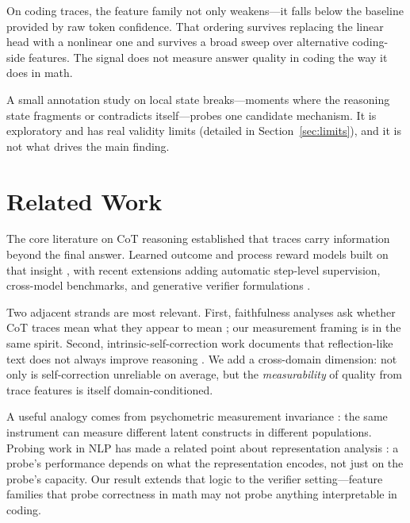 \documentclass[10pt,twocolumn]{article}
\begin{document}
On coding traces, the feature family not only weakens---it falls below the baseline provided by raw token confidence. That ordering survives replacing the linear head with a nonlinear one and survives a broad sweep over alternative coding-side features. The signal does not measure answer quality in coding the way it does in math.

A small annotation study on local state breaks---moments where the reasoning state fragments or contradicts itself---probes one candidate mechanism. It is exploratory and has real validity limits (detailed in Section~\ref{sec:limits}), and it is not what drives the main finding.

\section{Related Work}

The core literature on CoT reasoning \citep{wei2022cot,wang2023selfconsistency} established that traces carry information beyond the final answer. Learned outcome and process reward models built on that insight \citep{cobbe2021training,lightman2023verify}, with recent extensions adding automatic step-level supervision, cross-model benchmarks, and generative verifier formulations \citep{wang2024mathshepherd,zheng2025processbench,zhang2025genrm}.

Two adjacent strands are most relevant. First, faithfulness analyses ask whether CoT traces mean what they appear to mean \citep{lanham2023faithfulness}; our measurement framing is in the same spirit. Second, intrinsic-self-correction work documents that reflection-like text does not always improve reasoning \citep{madaan2023selfrefine,shinn2023reflexion,huang2024selfcorrect,liu2024intrinsic}. We add a cross-domain dimension: not only is self-correction unreliable on average, but the \emph{measurability} of quality from trace features is itself domain-conditioned.

A useful analogy comes from psychometric measurement invariance \citep{vandenberg2000review}: the same instrument can measure different latent constructs in different populations. Probing work in NLP has made a related point about representation analysis \citep{belinkov2022probing}: a probe's performance depends on what the representation encodes, not just on the probe's capacity. Our result extends that logic to the verifier setting---feature families that probe correctness in math may not probe anything interpretable in coding.
\end{document}
